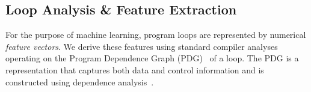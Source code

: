 \subsection{Loop Analysis \& Feature Extraction}
\label{loop_analysis_and_features}


For the purpose of machine learning, program loops are represented by numerical \textit{feature vectors}. We derive these features using standard compiler analyses operating on the Program Dependence Graph (PDG)~\cite{Ferrante:1987:PDG:24039.24041} of a loop. The PDG is a representation that captures both data and control information and is constructed using dependence analysis~\cite{Kennedy:2001:OCM:502981}.
